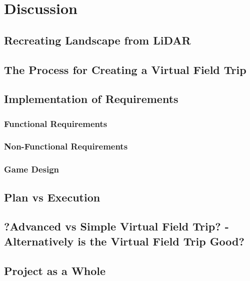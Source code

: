 \chapter{Discussion}
\label{chap:discussion}

\section{Recreating Landscape from LiDAR}

\section{The Process for Creating a Virtual Field Trip}

\section{Implementation of Requirements}
    \subsection{Functional Requirements}
    
    \subsection{Non-Functional Requirements}

    \subsection{Game Design}


\section{Plan vs Execution}

\section{?Advanced vs Simple Virtual Field Trip? - Alternatively is the Virtual Field Trip Good?}

\section{Project as a Whole}

